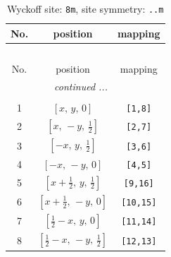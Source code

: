 \documentclass[fleqn,8pt]{jsarticle}
\begin{document}
\begin{longtable}{ccc}
\caption{Wyckoff site: {\tt 8m}, site symmetry: {\tt ..m}}
 \\
 \hline \hline
No. & position & mapping \\ \hline \endfirsthead

\multicolumn{2}{l}{\tablename\ \thetable{}} \\
 \hline \hline
No. & position & mapping \\ \hline \endhead

 \hline \hline
\multicolumn{2}{r}{\footnotesize\it continued ...} \\ \endfoot

 \hline \hline
\multicolumn{2}{r}{} \\ \endlastfoot

1 & $\left[ x,\, y,\, 0 \right]$ & {\tt [1,8]} \\ \hline
2 & $\left[ x,\, - y,\, \frac{1}{2} \right]$ & {\tt [2,7]} \\ \hline
3 & $\left[ - x,\, y,\, \frac{1}{2} \right]$ & {\tt [3,6]} \\ \hline
4 & $\left[ - x,\, - y,\, 0 \right]$ & {\tt [4,5]} \\ \hline
5 & $\left[ x + \frac{1}{2},\, y,\, \frac{1}{2} \right]$ & {\tt [9,16]} \\ \hline
6 & $\left[ x + \frac{1}{2},\, - y,\, 0 \right]$ & {\tt [10,15]} \\ \hline
7 & $\left[ \frac{1}{2} - x,\, y,\, 0 \right]$ & {\tt [11,14]} \\ \hline
8 & $\left[ \frac{1}{2} - x,\, - y,\, \frac{1}{2} \right]$ & {\tt [12,13]} \\
\end{longtable}
\renewcommand{\arraystretch}{1.2}
\end{document}
